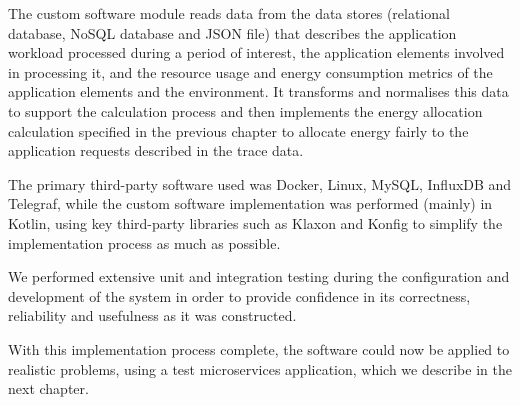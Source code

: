 The custom software module reads data from the data stores (relational database, NoSQL database and JSON file) that describes the application workload processed during a period of interest, the application elements involved in processing it, and the resource usage and energy consumption metrics of the application elements and the environment.  It transforms and normalises this data to support the calculation process and then implements the energy allocation calculation specified in the previous chapter to allocate energy fairly to the application requests described in the trace data.

The primary third-party software used was Docker, Linux, MySQL, InfluxDB and Telegraf, while the custom software implementation was performed (mainly) in Kotlin, using key third-party libraries such as Klaxon and Konfig to simplify the implementation process as much as possible.

We performed extensive unit and integration testing during the configuration and development of the system in order to provide confidence in its correctness, reliability and usefulness as it was constructed.

With this implementation process complete, the software could now be applied to realistic problems, using a test microservices application, which we describe in the next chapter.


